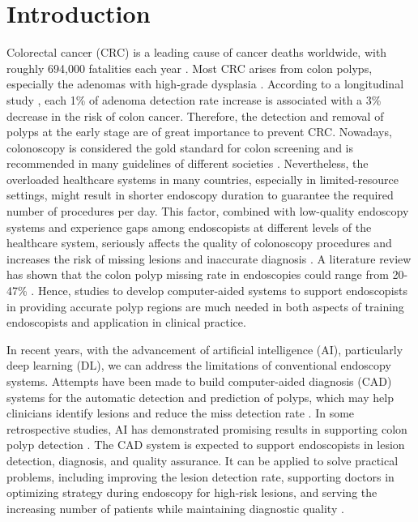 \documentclass[review, sort&compress]{elsarticle}
\begin{document}
\section{Introduction}

Colorectal cancer (CRC) is a leading cause of cancer deaths worldwide, with roughly 694,000 fatalities each year \cite{bernal2017comparative}. Most CRC arises from colon polyps, especially the adenomas with high-grade dysplasia \cite{gschwantler2002high}. According to a longitudinal study \cite{corley2014adenoma}, each 1\% of adenoma detection rate increase is associated with a 3\% decrease in the risk of colon cancer. Therefore, the detection and removal of polyps at the early stage are of great importance to prevent CRC. Nowadays, colonoscopy is considered the gold standard for colon screening and is recommended in many guidelines of different societies \cite{issa2017colorectal}.
Nevertheless, the overloaded healthcare systems in many countries, especially in limited-resource settings, might result in shorter endoscopy duration to guarantee the required number of procedures per day. This factor, combined with low-quality endoscopy systems and experience gaps among endoscopists at different levels of the healthcare system, seriously affects the quality of colonoscopy procedures and increases the risk of missing lesions and inaccurate diagnosis \cite{lee2008adequate, armin2015visibility}. A literature review has shown that the colon polyp missing rate in endoscopies could range from 20-47\% \cite{leufkens2012factors}. Hence, studies to develop computer-aided systems to support endoscopists in providing accurate polyp regions are much needed in both aspects of training endoscopists and application in clinical practice.

In recent years, with the advancement of artificial intelligence (AI), particularly deep learning (DL), we can address the limitations of conventional endoscopy systems. Attempts have been made to build computer-aided diagnosis (CAD) systems for the automatic detection and prediction of polyps, which may help clinicians identify lesions and reduce the miss detection rate  \cite{mesejo2016computer,zhou2019951e,kudo2019artificial}. In some retrospective studies, AI has demonstrated promising results in supporting colon polyp detection \cite{urban2018deep, viscaino2019machine}.
The CAD system is expected to support endoscopists in lesion detection, diagnosis, and quality assurance. It can be applied to solve practical problems, including improving the lesion detection rate, supporting doctors in optimizing strategy during endoscopy for high-risk lesions, and serving the increasing number of patients while maintaining diagnostic quality \cite{chen2018accurate, bisschops2019advanced}.
\end{document}
